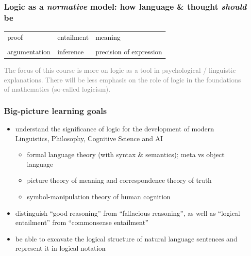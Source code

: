 \documentclass[fleqn,10pt,serif,xcolor=svgnames,xcolor=table,aspectratio=169]{beamer}
\newcommand{\mygray}[1]{\textcolor{gray}{#1}}
\begin{document}
\begin{frame}
  \frametitle{Logic as a \textit{normative} model: how language \& thought \textit{should} be}

  \begin{center}
    \begin{Large}
      \begin{tabular}{C{4cm}C{4cm}C{4cm}}
        proof & entailment & meaning \\
              & \\
        argumentation & inference & precision of expression
      \end{tabular}
    \end{Large}
  \end{center}


  \bigskip

  \begin{center}
    \begin{footnotesize}
      \mygray{The focus of this course is more on logic as a tool in psychological / linguistic explanations. There will be less emphasis on the role of logic in the foundations of mathematics (so-called logicism).}
    \end{footnotesize}
  \end{center}


\end{frame}

\begin{frame}
  \frametitle{Big-picture learning goals}
  \begin{itemize}
    \item understand the significance of logic for the development of modern Linguistics, Philosophy, Cognitive Science and AI
    \begin{itemize}
      \item formal language theory (with syntax \& semantics); meta vs object language
      \item picture theory of meaning and correspondence theory of truth
      \item symbol-manipulation theory of human cognition
    \end{itemize}
    \item distinguish ``good reasoning'' from ``fallacious reasoning'', as well as ``logical entailment'' from ``commonsense entailment''
    \item be able to excavate the logical structure of natural language sentences and represent it in logical notation
  \end{itemize}
\end{frame}
\end{document}
